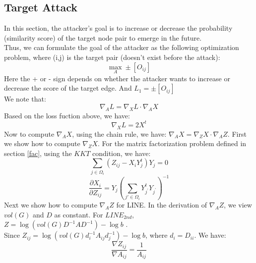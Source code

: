 \documentclass{acmtog} %
\begin{document}
\subsection{Target Attack}
In this section, the attacker's goal is to increase or decrease the probability (similarity
score) of the target node pair to emerge in the future.\\
\indent Thus, we can formulate the goal of the attacker as the following optimization problem, where (i,j) is the target pair (doesn't exist before the attack):
\begin{equation}
\max _ { A } \pm \left[O_{ij}\right]
\end{equation}
Here the + or - sign depends on whether
the attacker wants to increase or decrease the score of the target edge. And $L_1=\pm \left[O_{ij}\right]$\\
\indent We note that:
\begin{equation}
\nabla _ { A } L = \nabla _ { X } L \cdot \nabla _ { A } X
\end{equation}
Based on the loss fuction above, we have:
\begin{equation}
\nabla _ { X } L = 2X^{t}
\end{equation}
Now to compute $\nabla _ { A } X$, using the chain rule, we have: $\nabla _ { A } X =
\nabla _ { Z } X · \nabla _ { A } Z$. First we show how to compute $\nabla _ { Z } X$. For the matrix factorization problem defined in section \ref{fac}, using the $KKT$ condition, we have:
\begin{equation}
\sum _ { j \in \Omega _ { i } } \left( Z _ { i j } - X _ { i } Y _ { j } ^ { t } \right) Y _ { j } = 0
\end{equation}
\begin{equation}
\frac { \partial X _ { i } } { \partial Z _ { i j } } =  Y _ { j }\left( \sum _ { j' \in \Omega _ { i } } {Y _ { j ^ { \prime } } ^t} Y _ { j ^ { \prime } } \right) ^ { - 1 }
\end{equation}
Next we show how to compute $\nabla _ { A } Z$ for LINE. In the derivation of $\nabla _ { A } Z$,
we view $vol(G)$ and $D$ as constant. For $LINE_{2nd}$, $Z = \log \left( { vol } ( G ) D ^ { - 1 } A D ^ { - 1 } \right) - \log b$
. \\
\indent Since $Z _ { i j } = \log \left( v o l ( G ) d _ { i } ^ { - 1 } A _ { i j } d _ { j } ^ { - 1 } \right) - \log b$, where $d_i=D_{ii}$. We have:
\begin{equation}
\frac { \nabla Z _ { i j } } { \nabla A _ { i j } } = \frac { 1 } { A _ { i j } }
\end{equation}
\end{document}
